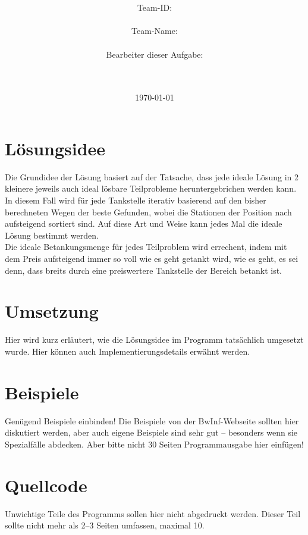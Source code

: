 \documentclass[a4paper,10pt,ngerman]{scrartcl}
\title{\textbf{\Huge\Aufgabe}}
\author{\LARGE Team-ID: \LARGE \TeamID \\\\
	    \LARGE Team-Name: \LARGE \TeamName \\\\
	    \LARGE Bearbeiter dieser Aufgabe: \\ 
	    \LARGE \Namen\\\\}
\date{\LARGE\today}
\begin{document}
\maketitle
\tableofcontents

\vspace{0.5cm}

\section{Lösungsidee}
Die Grundidee der Lösung basiert auf der Tatsache, dass jede ideale Lösung in 2 kleinere jeweils auch ideal lösbare Teilprobleme heruntergebrichen werden kann. In diesem Fall wird für jede Tankstelle iterativ basierend auf den bisher berechneten Wegen der beste Gefunden, wobei die Stationen der Position nach aufsteigend sortiert sind. Auf diese Art und Weise kann jedes Mal die ideale Lösung bestimmt werden. \\
Die ideale Betankungsmenge für jedes Teilproblem wird errechent, indem mit dem Preis aufsteigend immer so voll wie es geht getankt wird, wie es geht, es sei denn, dass breits durch eine preiswertere Tankstelle der Bereich betankt ist. 

\section{Umsetzung}
Hier wird kurz erläutert, wie die Lösungsidee im Programm tatsächlich umgesetzt wurde. Hier können auch Implementierungsdetails erwähnt werden.

\section{Beispiele}
Genügend Beispiele einbinden! Die Beispiele von der BwInf-Webseite sollten hier diskutiert werden, aber auch eigene Beispiele sind sehr gut – besonders wenn sie Spezialfälle abdecken. Aber bitte nicht 30 Seiten Programmausgabe hier einfügen!

\section{Quellcode}
Unwichtige Teile des Programms sollen hier nicht abgedruckt werden. Dieser Teil sollte nicht mehr als 2–3 Seiten umfassen, maximal 10.
\end{document}
